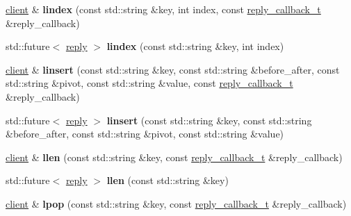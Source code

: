 \begin{DoxyCompactItemize}
\mbox{\hyperlink{classcpp__redis_1_1client}{client}} \& {\bfseries lindex} (const std\+::string \&key, int index, const \mbox{\hyperlink{classcpp__redis_1_1client_af7a65eb21aa25230bfbb0b0203c4fc04}{reply\+\_\+callback\+\_\+t}} \&reply\+\_\+callback)
\item 
\mbox{\label{classcpp__redis_1_1client_a58458ef30b1fb49584395b6f8584b931}} 
std\+::future$<$ \mbox{\hyperlink{classcpp__redis_1_1reply}{reply}} $>$ {\bfseries lindex} (const std\+::string \&key, int index)
\item 
\mbox{\label{classcpp__redis_1_1client_a80799f12e6aafe07872b2bbea453db53}} 
\mbox{\hyperlink{classcpp__redis_1_1client}{client}} \& {\bfseries linsert} (const std\+::string \&key, const std\+::string \&before\+\_\+after, const std\+::string \&pivot, const std\+::string \&value, const \mbox{\hyperlink{classcpp__redis_1_1client_af7a65eb21aa25230bfbb0b0203c4fc04}{reply\+\_\+callback\+\_\+t}} \&reply\+\_\+callback)
\item 
\mbox{\label{classcpp__redis_1_1client_ab8d167d78e3c956fd1ade0e2f992f46a}} 
std\+::future$<$ \mbox{\hyperlink{classcpp__redis_1_1reply}{reply}} $>$ {\bfseries linsert} (const std\+::string \&key, const std\+::string \&before\+\_\+after, const std\+::string \&pivot, const std\+::string \&value)
\item 
\mbox{\label{classcpp__redis_1_1client_a2e0a911a6bb87224896b7c33da7ac058}} 
\mbox{\hyperlink{classcpp__redis_1_1client}{client}} \& {\bfseries llen} (const std\+::string \&key, const \mbox{\hyperlink{classcpp__redis_1_1client_af7a65eb21aa25230bfbb0b0203c4fc04}{reply\+\_\+callback\+\_\+t}} \&reply\+\_\+callback)
\item 
\mbox{\label{classcpp__redis_1_1client_a2890fccb9efd08b38195c8fb5fd1651e}} 
std\+::future$<$ \mbox{\hyperlink{classcpp__redis_1_1reply}{reply}} $>$ {\bfseries llen} (const std\+::string \&key)
\item 
\mbox{\label{classcpp__redis_1_1client_ad4060807b9b9aa330ad11dedd69e80b8}} 
\mbox{\hyperlink{classcpp__redis_1_1client}{client}} \& {\bfseries lpop} (const std\+::string \&key, const \mbox{\hyperlink{classcpp__redis_1_1client_af7a65eb21aa25230bfbb0b0203c4fc04}{reply\+\_\+callback\+\_\+t}} \&reply\+\_\+callback)

\end{DoxyCompactItemize}
